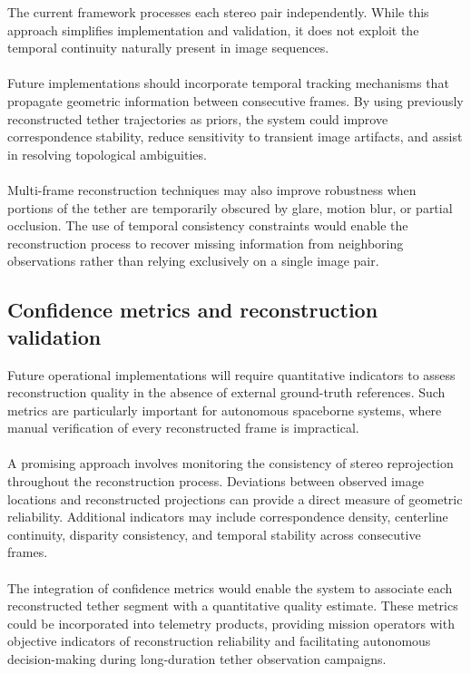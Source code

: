 The current framework processes each stereo pair independently. While this approach simplifies implementation and validation, it does not exploit the temporal continuity naturally present in image sequences.
\\\\
Future implementations should incorporate temporal tracking mechanisms that propagate geometric information between consecutive frames. By using previously reconstructed tether trajectories as priors, the system could improve correspondence stability, reduce sensitivity to transient image artifacts, and assist in resolving topological ambiguities.
\\\\
Multi-frame reconstruction techniques may also improve robustness when portions of the tether are temporarily obscured by glare, motion blur, or partial occlusion. The use of temporal consistency constraints would enable the reconstruction process to recover missing information from neighboring observations rather than relying exclusively on a single image pair.

\subsection{Confidence metrics and reconstruction validation}

Future operational implementations will require quantitative indicators to assess reconstruction quality in the absence of external ground-truth references. Such metrics are particularly important for autonomous spaceborne systems, where manual verification of every reconstructed frame is impractical.
\\\\
A promising approach involves monitoring the consistency of stereo reprojection throughout the reconstruction process. Deviations between observed image locations and reconstructed projections can provide a direct measure of geometric reliability. Additional indicators may include correspondence density, centerline continuity, disparity consistency, and temporal stability across consecutive frames.
\\\\
The integration of confidence metrics would enable the system to associate each reconstructed tether segment with a quantitative quality estimate. These metrics could be incorporated into telemetry products, providing mission operators with objective indicators of reconstruction reliability and facilitating autonomous decision-making during long-duration tether observation campaigns.

